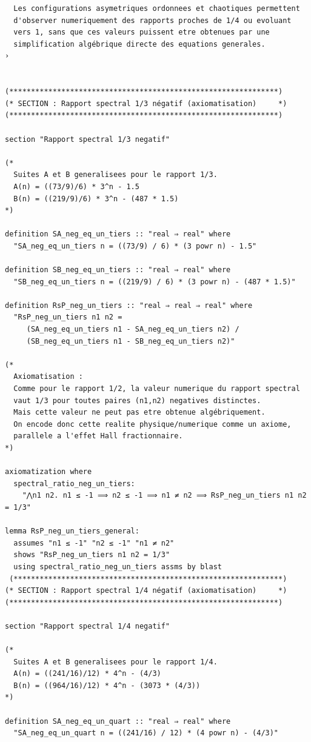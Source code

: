 \documentclass[a4paper,11pt]{article}
\begin{document}
\begin{holcode}[title={\textcolor{white}{Fichier : methode\_spectral.thy -- Partie 1/4}}]
\begin{lstlisting}
  Les configurations asymetriques ordonnees et chaotiques permettent
  d'observer numeriquement des rapports proches de 1/4 ou evoluant
  vers 1, sans que ces valeurs puissent etre obtenues par une
  simplification algébrique directe des equations generales.
›


(**************************************************************)
(* SECTION : Rapport spectral 1/3 négatif (axiomatisation)     *)
(**************************************************************)

section "Rapport spectral 1/3 negatif"

(*
  Suites A et B generalisees pour le rapport 1/3.
  A(n) = ((73/9)/6) * 3^n - 1.5
  B(n) = ((219/9)/6) * 3^n - (487 * 1.5)
*)

definition SA_neg_eq_un_tiers :: "real ⇒ real" where
  "SA_neg_eq_un_tiers n = ((73/9) / 6) * (3 powr n) - 1.5"

definition SB_neg_eq_un_tiers :: "real ⇒ real" where
  "SB_neg_eq_un_tiers n = ((219/9) / 6) * (3 powr n) - (487 * 1.5)"

definition RsP_neg_un_tiers :: "real ⇒ real ⇒ real" where
  "RsP_neg_un_tiers n1 n2 =
     (SA_neg_eq_un_tiers n1 - SA_neg_eq_un_tiers n2) /
     (SB_neg_eq_un_tiers n1 - SB_neg_eq_un_tiers n2)"

(*
  Axiomatisation :
  Comme pour le rapport 1/2, la valeur numerique du rapport spectral
  vaut 1/3 pour toutes paires (n1,n2) negatives distinctes.
  Mais cette valeur ne peut pas etre obtenue algébriquement.
  On encode donc cette realite physique/numerique comme un axiome,
  parallele a l'effet Hall fractionnaire.
*)

axiomatization where
  spectral_ratio_neg_un_tiers:
    "⋀n1 n2. n1 ≤ -1 ⟹ n2 ≤ -1 ⟹ n1 ≠ n2 ⟹ RsP_neg_un_tiers n1 n2 = 1/3"

lemma RsP_neg_un_tiers_general:
  assumes "n1 ≤ -1" "n2 ≤ -1" "n1 ≠ n2"
  shows "RsP_neg_un_tiers n1 n2 = 1/3"
  using spectral_ratio_neg_un_tiers assms by blast
 (**************************************************************)
(* SECTION : Rapport spectral 1/4 négatif (axiomatisation)     *)
(**************************************************************)

section "Rapport spectral 1/4 negatif"

(*
  Suites A et B generalisees pour le rapport 1/4.
  A(n) = ((241/16)/12) * 4^n - (4/3)
  B(n) = ((964/16)/12) * 4^n - (3073 * (4/3))
*)

definition SA_neg_eq_un_quart :: "real ⇒ real" where
  "SA_neg_eq_un_quart n = ((241/16) / 12) * (4 powr n) - (4/3)"


\end{lstlisting}
\end{holcode}
\end{document}
